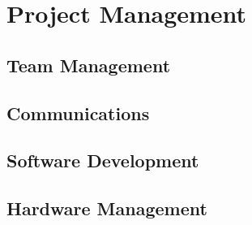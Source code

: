 \section{Project Management}
\subsection{Team Management}
\subsection{Communications}
\subsection{Software Development}
\subsection{Hardware Management}
